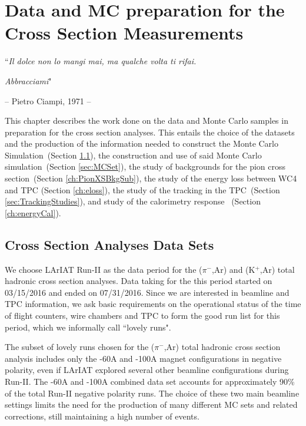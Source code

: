 \chapter{Data and MC preparation for the Cross Section Measurements}\label{ch:samples}
{\raggedleft ``\emph{Il dolce non lo mangi mai, ma qualche volta ti rifai.} \par}
{\raggedleft \emph{Abbracciami}"\par}
{\raggedleft -- Pietro Ciampi,  1971 -- \par}%
\vspace{0.5cm}



This chapter describes the  work done on the  data and Monte Carlo samples in preparation for the cross section analyses. 
This entails the choice of the datasets and the production of the information needed to construct the Monte Carlo Simulation~(Section  \ref{sec:dataSet}),  the construction and use of said Monte Carlo simulation~(Section \ref{sec:MCSet}), the study of backgrounds for the pion cross section~(Section  \ref{ch:PionXSBkgSub}), the study of the energy loss between WC4 and TPC (Section \ref{ch:eloss}), the study of the tracking in the TPC~(Section  \ref{sec:TrackingStudies}), and study of  the calorimetry response ~(Section  \ref{ch:energyCal}). 


\section{Cross Section Analyses Data Sets}\label{sec:dataSet}
We choose LArIAT Run-II as the data period for the  ($\pi^{-}$,Ar) and (K$^{+}$,Ar) total hadronic cross section analyses. 
Data taking for the this period started on 03/15/2016  and ended on 07/31/2016. 
Since we are interested in beamline and TPC information, we ask basic requirements on the operational status of the time of flight counters, wire chambers and TPC to form the good run list for this period, which we informally call ``lovely runs".

The subset of lovely runs  chosen for the  ($\pi^{-}$,Ar) total hadronic cross section analysis includes only the -60A and -100A magnet configurations in negative polarity, even if LArIAT explored several other beamline configurations during Run-II. The -60A and -100A combined data set accounts for approximately 90\% of the total Run-II negative polarity runs.   The  choice of these two main beamline settings limits the need for the production of many different MC sets and related corrections, still maintaining a high number of events. 

